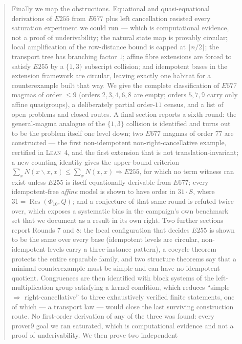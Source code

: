 \documentclass[11pt]{article}
\theoremstyle{plain}
\theoremstyle{definition}
\theoremstyle{remark}
\numberwithin{equation}{section}
\begin{document}
\begin{abstract}
Finally we map the obstructions. Equational and quasi-equational derivations of $E255$ from
$E677$ plus left cancellation resisted every saturation experiment we could run --- which is
computational evidence, not a proof of underivability; the natural state map
is provably circular; local amplification of the row-distance bound is capped at
$\lfloor n/2\rfloor$; the transport tree has branching factor $1$; affine fibre extensions
are forced to satisfy $E255$ by a $\{1,3\}$ subscript collision; and idempotent bases in the
extension framework are circular, leaving exactly one habitat for a counterexample built that
way. We give the complete classification of $E677$ magmas of order $\le 9$ (orders
$2,3,4,6,8$ are empty; orders $5,7,9$ carry only affine quasigroups), a deliberately partial
order-$11$ census, and a list of open problems and closed routes.
A final section reports a sixth round: the general-magma analogue of the $\{1,3\}$
collision is identified and turns out to be the problem itself one level down; two $E677$
magmas of order $77$ are constructed --- the first non-idempotent non-right-cancellative
example, certified in \textsc{Lean}~4, and the first extension that is not
translation-invariant; a new counting identity gives the upper-bound criterion
$\sum_xN(x\backslash x,x)\le\sum_xN(x,x)\Rightarrow E255$, for which no term witness
can exist unless $E255$ is itself equationally derivable from $E677$; every idempotent-free \emph{affine} model is shown to have order in $31\cdot S$,
where $31 = \operatorname{Res}(\Phi_{10},Q)$; and a conjecture of that same round is
refuted twice over, which exposes a systematic bias in the campaign's own benchmark set
that we document as a result in its own right.
Two further sections report Rounds 7 and 8: the local configuration that decides $E255$ is
shown to be the same over every base (idempotent levels are circular, non-idempotent levels
carry a three-instance pattern), a cocycle theorem protects the entire separable family, and
two structure theorems say that a minimal counterexample must be simple and can have no
idempotent quotient. Congruences are then identified with block systems of the
left-multiplication group satisfying a kernel condition, which reduces ``simple $\Rightarrow$
right-cancellative'' to three exhaustively verified finite statements, one of which --- a
transport law --- would close the last surviving construction route. No first-order
derivation of any of the three was found: every prover9 goal we ran saturated, which is
computational evidence and not a proof of underivability. We then prove two independent

\end{abstract}
\end{document}
